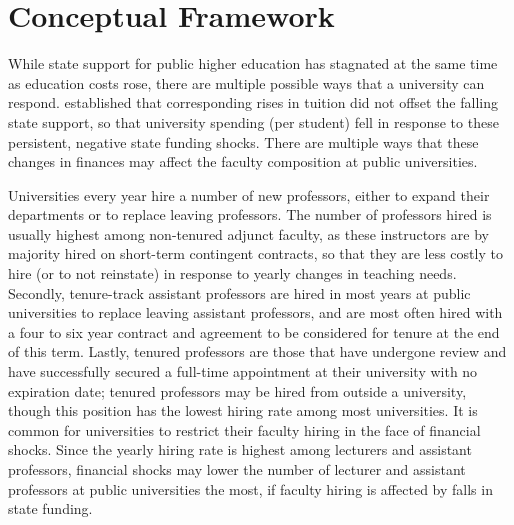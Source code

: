 \section{Conceptual Framework}
\label{sec:conceptual}
%
%

While state support for public higher education has stagnated at the same time as education costs rose, there are multiple possible ways that a university can respond.
\cite{NBERw23736} established that corresponding rises in tuition did not offset the falling state support, so that university spending (per student) fell in response to these persistent, negative state funding shocks.
There are multiple ways that these changes in finances may affect the faculty composition at public universities.

Universities every year hire a number of new professors, either to expand their departments or to replace leaving professors.
The number of professors hired is usually highest among non-tenured adjunct faculty, as these instructors are by majority hired on short-term contingent contracts, so that they are less costly to hire (or to not reinstate) in response to yearly changes in teaching needs.
Secondly, tenure-track assistant professors are hired in most years at public universities to replace leaving assistant professors, and are most often hired with a four to six year contract and agreement to be considered for tenure at the end of this term.
Lastly, tenured professors are those that have undergone review and have successfully secured a full-time appointment at their university with no expiration date; tenured professors may be hired from outside a university, though this position has the lowest hiring rate among most universities.
It is common for universities to restrict their faculty hiring in the face of financial shocks.
Since the yearly hiring rate is highest among lecturers and assistant professors, financial shocks may lower the number of lecturer and assistant professors at public universities the most, if faculty hiring is affected by falls in state funding.

